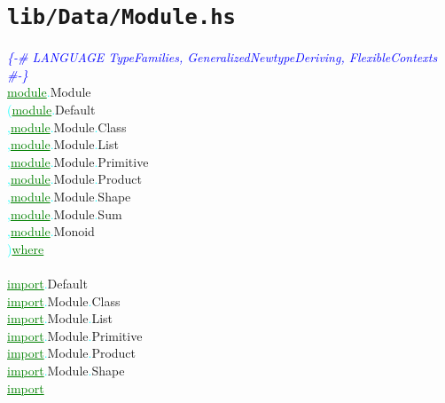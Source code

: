 \section{\texttt{lib/Data/Module.hs}}
\label{mod:Data.Module}
\textcolor{blue}{{\it{}\{-\# LANGUAGE TypeFamilies, GeneralizedNewtypeDeriving, FlexibleContexts \#-\}}}\\\textcolor{green}{\underline{module}}\textcolor{cyan}{.}{\rm{}Module}\\\hstab \textcolor{cyan}{(}\hsspace \textcolor{green}{\underline{module}}\textcolor{cyan}{.}{\rm{}Default}\\\hstab \textcolor{cyan}{,}\hsspace \textcolor{green}{\underline{module}}\textcolor{cyan}{.}{\rm{}Module}\textcolor{cyan}{.}{\rm{}Class}\\\hstab \textcolor{cyan}{,}\hsspace \textcolor{green}{\underline{module}}\textcolor{cyan}{.}{\rm{}Module}\textcolor{cyan}{.}{\rm{}List}\\\hstab \textcolor{cyan}{,}\hsspace \textcolor{green}{\underline{module}}\textcolor{cyan}{.}{\rm{}Module}\textcolor{cyan}{.}{\rm{}Primitive}\\\hstab \textcolor{cyan}{,}\hsspace \textcolor{green}{\underline{module}}\textcolor{cyan}{.}{\rm{}Module}\textcolor{cyan}{.}{\rm{}Product}\\\hstab \textcolor{cyan}{,}\hsspace \textcolor{green}{\underline{module}}\textcolor{cyan}{.}{\rm{}Module}\textcolor{cyan}{.}{\rm{}Shape}\\\hstab \textcolor{cyan}{,}\hsspace \textcolor{green}{\underline{module}}\textcolor{cyan}{.}{\rm{}Module}\textcolor{cyan}{.}{\rm{}Sum}\\\hstab \textcolor{cyan}{,}\hsspace \textcolor{green}{\underline{module}}\textcolor{cyan}{.}{\rm{}Monoid}\\\hstab \textcolor{cyan}{)}\hsspace \textcolor{green}{\underline{where}}\\\\\textcolor{green}{\underline{import}}\textcolor{cyan}{.}{\rm{}Default}\\\textcolor{green}{\underline{import}}\textcolor{cyan}{.}{\rm{}Module}\textcolor{cyan}{.}{\rm{}Class}\\\textcolor{green}{\underline{import}}\textcolor{cyan}{.}{\rm{}Module}\textcolor{cyan}{.}{\rm{}List}\\\textcolor{green}{\underline{import}}\textcolor{cyan}{.}{\rm{}Module}\textcolor{cyan}{.}{\rm{}Primitive}\\\textcolor{green}{\underline{import}}\textcolor{cyan}{.}{\rm{}Module}\textcolor{cyan}{.}{\rm{}Product}\\\textcolor{green}{\underline{import}}\textcolor{cyan}{.}{\rm{}Module}\textcolor{cyan}{.}{\rm{}Shape}\\\textcolor{green}{\underline{import}}\hsspace 